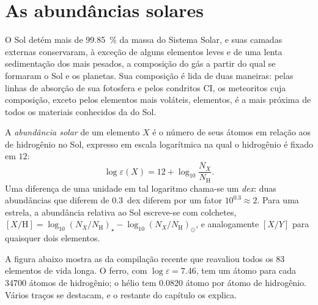 \section{As abundâncias solares}\label{sec:b3:origin-of-elements:solar}

O Sol detém mais de \qty{99.85}{\percent} da massa do Sistema
Solar, e suas camadas externas conservaram, à exceção de alguns elementos leves
e de uma lenta sedimentação dos mais pesados, a composição do gás a partir do qual
se formaram o Sol e os planetas. Sua composição é lida de duas maneiras:
pelas linhas de absorção de sua fotosfera e pelos condritos CI,
os meteoritos cuja composição, exceto pelos elementos mais voláteis,
elementos, é a mais próxima de todos os materiais conhecidos da do Sol.

\begin{definition}\label{def:b3:origin-of-elements:abundance}
A \emph{abundância solar} de um elemento $X$ é
o número de seus átomos em relação aos de hidrogênio no Sol,
expresso em escala logarítmica na qual o hidrogênio é fixado em $12$:
\[
\log\varepsilon(X) = 12 + \log_{10}\frac{N_X}{N_\mathrm{H}} .
\]
Uma diferença de uma unidade em tal logaritmo chama-se um
\emph{dex}: duas abundâncias que diferem de $0.3$~dex diferem por
um fator $10^{0.3} \approx 2$. Para uma estrela, a abundância relativa ao
Sol escreve-se com colchetes,
$[X/\mathrm{H}] = \log_{10}(N_X/N_\mathrm{H})_\star -
\log_{10}(N_X/N_\mathrm{H})_\odot$, e analogamente $[X/Y]$ para quaisquer dois
elementos.
\end{definition}

A figura abaixo mostra as  da compilação recente
que reavaliou todos os 83 elementos de vida longa. O ferro, com
$\log\varepsilon = 7.46$, tem um átomo para cada \num{34700} átomos de
hidrogênio; o hélio tem \num{0.0820} átomo por átomo de hidrogênio. Vários
traços se destacam, e o restante do capítulo os explica.

